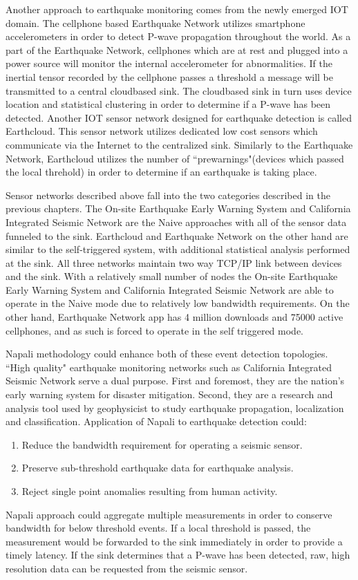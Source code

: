 Another approach to earthquake monitoring comes from the newly emerged IOT domain.
The cellphone based Earthquake Network \cite{finazzi2017statistical} utilizes smartphone accelerometers in order to detect P-wave propagation throughout the world.
As a part of the Earthquake Network, cellphones which are at rest and plugged into a power source will monitor the internal accelerometer for abnormalities.
If the inertial tensor recorded by the cellphone passes a threshold a message will be transmitted to a central cloudbased sink.
The cloudbased sink in turn uses device location and statistical clustering in order to determine if a P-wave has been detected.
Another IOT sensor network designed for earthquake detection is called Earthcloud.\cite{klapez2018first}
This sensor network utilizes dedicated low cost sensors which communicate via the Internet to the centralized sink.
Similarly to the Earthquake Network, Earthcloud utilizes the number of ``prewarnings"(devices which passed the local threhold) in order to determine if an earthquake is taking place.

Sensor networks described above fall into the two categories described in the previous chapters.
The On-site Earthquake Early Warning System and California Integrated Seismic Network are the Naive approaches with all of the sensor data funneled to the sink.
Earthcloud and Earthquake Network on the other hand are similar to the self-triggered system, with additional statistical analysis performed at the sink.
All three networks maintain two way TCP/IP link between devices and the sink.
With a relatively small number of nodes the On-site Earthquake Early Warning System and California Integrated Seismic Network are able to operate in the Naive mode due to relatively low bandwidth requirements.
On the other hand, Earthquake Network app has 4 million downloads and 75000 active cellphones, and as such is forced to operate in the self triggered mode.

Napali methodology could enhance both of these event detection topologies.
``High quality" earthquake monitoring networks such as California Integrated Seismic Network serve a dual purpose.
First and foremost, they are the nation's early warning system for disaster mitigation.
Second, they are a research and analysis tool used by geophysicist to study earthquake propagation, localization and classification.
Application of Napali to earthquake detection could:
\begin{enumerate}
    \item Reduce the bandwidth requirement for operating a seismic sensor.
    \item Preserve sub-threshold earthquake data for earthquake analysis.
    \item Reject single point anomalies resulting from human activity.
\end{enumerate}
Napali approach could aggregate multiple measurements in order to conserve bandwidth for below threshold events.
If a local threshold is passed, the measurement would be forwarded to the sink immediately in order to provide a timely latency.
If the sink determines that a P-wave has been detected, raw, high resolution data can be requested from the seismic sensor.

